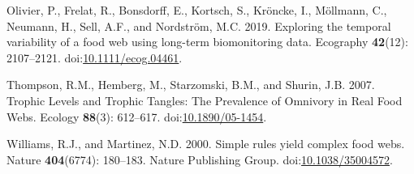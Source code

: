 \documentclass[
]{article}
\newlength{\cslhangindent}
\newenvironment{CSLReferences}[2] %
 {\begin{list}{}{%
  \setlength{\itemindent}{0pt}
  \setlength{\leftmargin}{0pt}
  \setlength{\parsep}{0pt}
  \ifodd #1
   \setlength{\leftmargin}{\cslhangindent}
   \setlength{\itemindent}{-1\cslhangindent}
  \fi
  \setlength{\itemsep}{#2\baselineskip}}}
 {\end{list}}
\begin{document}
\begin{CSLReferences}{1}{0}
Olivier, P., Frelat, R., Bonsdorff, E., Kortsch, S., Kröncke, I.,
Möllmann, C., Neumann, H., Sell, A.F., and Nordström, M.C. 2019.
Exploring the temporal variability of a food web using long-term
biomonitoring data. Ecography \textbf{42}(12): 2107--2121.
doi:\href{https://doi.org/10.1111/ecog.04461}{10.1111/ecog.04461}.

Thompson, R.M., Hemberg, M., Starzomski, B.M., and Shurin, J.B. 2007.
Trophic {Levels} and {Trophic Tangles}: {The Prevalence} of {Omnivory}
in {Real Food Webs}. Ecology \textbf{88}(3): 612--617.
doi:\href{https://doi.org/10.1890/05-1454}{10.1890/05-1454}.

Williams, R.J., and Martinez, N.D. 2000. Simple rules yield complex food
webs. Nature \textbf{404}(6774): 180--183. Nature Publishing Group.
doi:\href{https://doi.org/10.1038/35004572}{10.1038/35004572}.

\end{CSLReferences}
\end{document}
